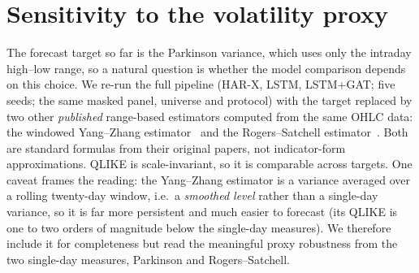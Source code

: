 \documentclass[runningheads]{llncs}
\begin{document}
\section{Sensitivity to the volatility proxy}\label{sec:proxy}
The forecast target so far is the Parkinson variance, which uses only the intraday high--low range, so a natural
question is whether the model comparison depends on this choice. We re-run the full pipeline (HAR-X, LSTM,
LSTM+GAT; five seeds; the same masked panel, universe and protocol) with the target replaced by two other
\emph{published} range-based estimators computed from the same OHLC data: the windowed Yang--Zhang
estimator~\cite{yangzhang2000} and the Rogers--Satchell estimator~\cite{rogers1991}. Both are standard formulas
from their original papers, not indicator-form approximations. QLIKE is scale-invariant, so it is comparable
across targets. One caveat frames the reading: the Yang--Zhang estimator is a variance averaged over a
rolling twenty-day window, i.e.\ a \emph{smoothed level} rather than a single-day variance, so it is far more
persistent and much easier to forecast (its QLIKE is one to two orders of magnitude below the single-day
measures). We therefore include it for completeness but read the meaningful proxy robustness from the two
single-day measures, Parkinson and Rogers--Satchell.
\end{document}

